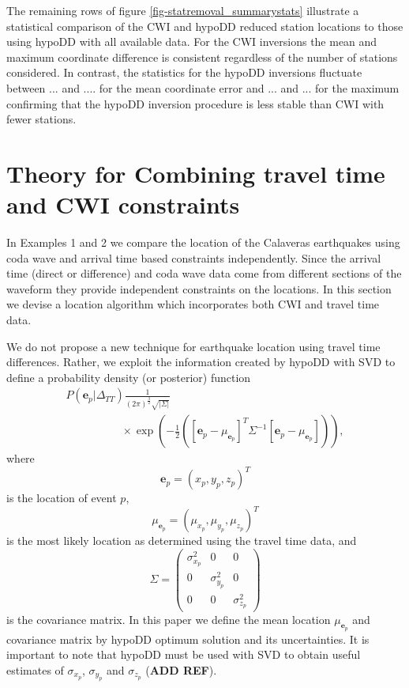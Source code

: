 \documentclass[extra]{gji}
\begin{document}
The remaining rows of figure \ref{fig-statremoval_summarystats}
illustrate a statistical comparison of the CWI and hypoDD reduced
station locations to those using hypoDD with all available data. For
the CWI inversions the mean and maximum coordinate difference is
consistent regardless of the number of stations considered. In
contrast, the statistics for the hypoDD inversions fluctuate between
... and .... for the mean coordinate error and ... and ...  for the
maximum confirming that the hypoDD inversion procedure is less
stable than CWI with fewer stations.

\section{Theory for Combining travel time and CWI constraints}

In Examples 1 and 2 we compare the location of the Calaveras
earthquakes using coda wave and arrival time based constraints
independently. Since the arrival time (direct or difference) and
coda wave data
 come from different sections of the waveform they provide independent constraints on the locations.
 In this section we devise a location algorithm which incorporates
 both CWI and travel time data.

We do not propose a new technique for earthquake location using
travel time differences. Rather, we exploit the information created
by hypoDD with SVD to define a probability density (or posterior)
function
\begin{equation}
\label{eq-multi-var-Gauss-tt} 
\begin{array}{l}
P(\mathbf{e}_p|\Delta_{TT}) 
\frac{1}{(2\pi)^{\frac{3}{2}}\sqrt{|\Sigma|}} \\
\hspace{5em} \times \exp
\left({-\frac{1}{2}\left([\mathbf{e}_p-\mu_{\mathbf{e}_p}]^T
\Sigma^{-1} [\mathbf{e}_p-\mu_{\mathbf{e}_p}]\right)} \right),
\end{array}
\end{equation}
where
\begin{equation}
\mathbf{e}_p = (x_p,y_p,z_p)^T
\end{equation}
is the location of event $p$,
\begin{equation}
\mu_{\mathbf{e}_p} = (\mu_{x_p}, \mu_{y_p},\mu_{z_p})^T
\end{equation}
is the most likely location as determined using the travel time
data, and
\begin{equation}
\label{eq:Sigma-expression}
\Sigma = \left( \begin{array}{ccc} \sigma_{x_p}^2 & 0 & 0\\
0 &  \sigma_{y_p}^2 & 0 \\
0 & 0 & \sigma_{z_p}^2  \end{array} \right)
\end{equation}
is the covariance matrix. In this paper we define the mean location
$\mu_{\mathbf{e}_p}$ and covariance matrix by hypoDD optimum
solution and its uncertainties. It is important to note that hypoDD
must be used with SVD to obtain useful estimates of $\sigma_{x_p}$,
$\sigma_{y_p}$ and $\sigma_{z_p}$ (\textbf{ADD REF}).
\end{document}
